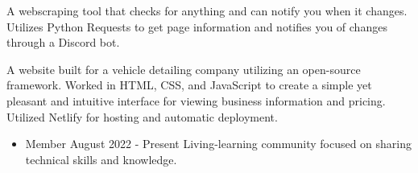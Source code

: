 \documentclass[10pt,a4paper,ragged2e,withhyper]{altacv}
\begin{document}
\begin{paracol}{2}
    \divider
    
    A webscraping tool that checks for anything and can notify you when it changes. Utilizes Python Requests to get page information and notifies you of changes through a Discord bot. 
    \smallskip \smallskip
    \newline
    \newline
    
    \divider
    
    A website built for a vehicle detailing company utilizing an open-source \newline framework. Worked in HTML, CSS, and JavaScript to create a simple yet \newline pleasant and intuitive interface for viewing business information and pricing. \newline Utilized Netlify for hosting and automatic deployment.
    \smallskip \smallskip
    \newline
       
    \newline
    
    
    
    \switchcolumn
    \bigskip
    \bigskip
    
    \smallskip
    \begin{itemize}
    \item {{\color{emphasis}Member} {{\color{accent}\faCalendar}\color{emphasis} August 2022 - Present}
        \newline
        \smallskip
        Living-learning community \newline focused on sharing technical skills and knowledge.}
    \end{itemize}
    
    \bigskip


\end{paracol}
\end{document}
